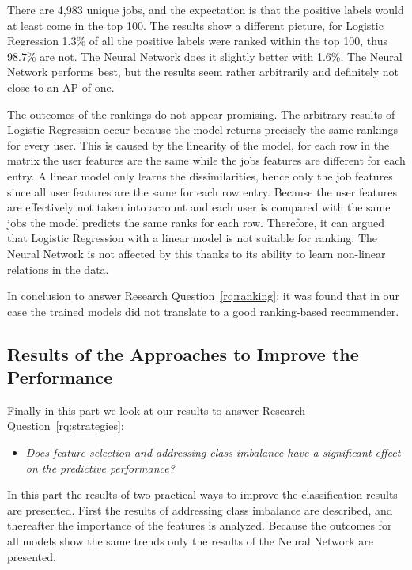 There are 4,983 unique jobs, and the expectation is that the positive labels would at least come in the top 100. 
The results show a different picture, for Logistic Regression 1.3\% of all the positive labels were ranked within the top 100, thus 98.7\% are not.
The Neural Network does it slightly better with 1.6\%.
The Neural Network performs best, but the results seem rather arbitrarily and definitely not close to an AP of one.

The outcomes of the rankings do not appear promising. 
The arbitrary results of Logistic Regression occur because the model returns precisely the same rankings for every user.
This is caused by the linearity of the model, for each row in the matrix the user features are the same while the jobs features are different for each entry.
A linear model only learns the dissimilarities, hence only the job features since all user features are the same for each row entry. 
Because the user features are effectively not taken into account and each user is compared with the same jobs the model predicts the same ranks for each row.
Therefore, it can argued that Logistic Regression with a linear model is not suitable for ranking.
The Neural Network is not affected by this thanks to its ability to learn non-linear relations in the data. 

In conclusion to answer Research Question~\ref{rq:ranking}: it was found that in our case the trained models did not translate to a good ranking-based recommender.

\subsection{Results of the Approaches to Improve the Performance}
\label{ssec:ir}

Finally in this part we look at our results to answer Research Question~\ref{rq:strategies}:
\begin{itemize}
	\item[] \em Does feature selection and addressing class imbalance have a significant effect on the predictive performance?
\end{itemize}

\noindent In this part the results of two practical ways to improve the classification results are presented. 
First the results of addressing class imbalance are described, and thereafter the importance of the features is analyzed. 
Because the outcomes for all models show the same trends only the results of the Neural Network are presented.

